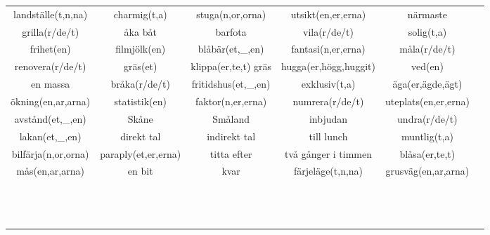 
\begin{center}
    \begin{adjustwidth}{-2.4cm}{}
        \begin{tabular}{|c c c c c c|}
            \hline
            landställe(t,n,na) & charmig(t,a) & stuga(n,or,orna) & utsikt(en,er,erna) & närmaste &  \\
            grilla(r/de/t) & åka båt & barfota & vila(r/de/t) & solig(t,a) &  \\
            frihet(en) & filmjölk(en) & blåbär(et,\_,en) & fantasi(n,er,erna) & måla(r/de/t) &  \\
            renovera(r/de/t) & gräs(et) & klippa(er,te,t) gräs & hugga(er,högg,huggit) & ved(en) &  \\
            en massa & bråka(r/de/t) & fritidshus(et,\_,en) & exklusiv(t,a) & äga(er,ägde,ägt) &  \\
            ökning(en,ar,arna) & statistik(en) & faktor(n,er,erna) & numrera(r/de/t) & uteplats(en,er,erna) &  \\
            avstånd(et,\_,en) & Skåne & Småland & inbjudan & undra(r/de/t) &  \\
            lakan(et,\_,en) & direkt tal & indirekt tal & till lunch & muntlig(t,a) &  \\
            bilfärja(n,or,orna) & paraply(et,er,erna) & titta efter & två gånger i timmen & blåsa(er,te,t) &  \\
            mås(en,ar,arna) & en bit & kvar & färjeläge(t,n,na) & grusväg(en,ar,arna) &  \\
             &  &  &  &  &  \\
             &  &  &  &  &  \\
             &  &  &  &  &  \\
             &  &  &  &  &  \\
             &  &  &  &  &  \\
             &  &  &  &  &  \\
             &  &  &  &  &  \\
             &  &  &  &  &  \\
             &  &  &  &  &  \\
             &  &  &  &  &  \\
             &  &  &  &  &  \\
             &  &  &  &  &  \\
             &  &  &  &  &  \\

\end{tabular}
\end{adjustwidth}
\end{center}
